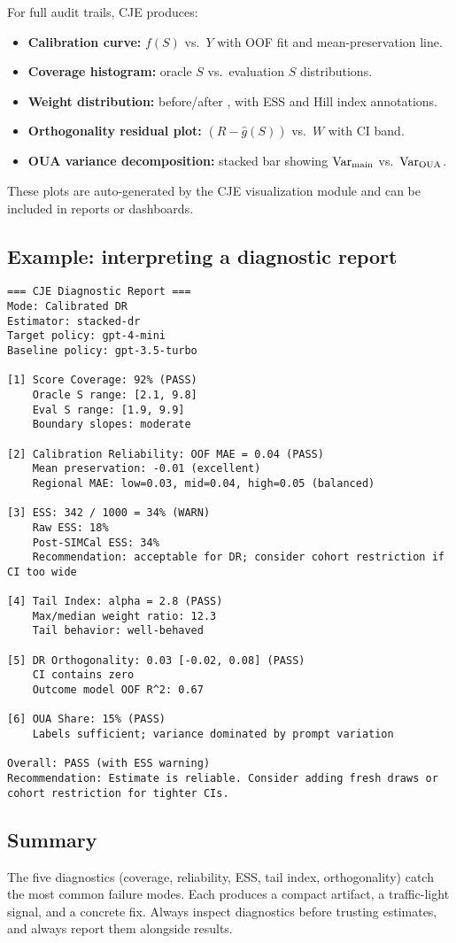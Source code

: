 For full audit trails, CJE produces:
\begin{itemize}
\item \textbf{Calibration curve:} $f(S)$ vs.\ $Y$ with OOF fit and mean-preservation line.
\item \textbf{Coverage histogram:} oracle $S$ vs.\ evaluation $S$ distributions.
\item \textbf{Weight distribution:} before/after \simcal, with ESS and Hill index annotations.
\item \textbf{Orthogonality residual plot:} $(R - \hat{g}(S))$ vs.\ $W$ with CI band.
\item \textbf{OUA variance decomposition:} stacked bar showing $\operatorname{Var}_{\text{main}}$ vs.\ $\operatorname{Var}_{\text{OUA}}$.
\end{itemize}

These plots are auto-generated by the CJE visualization module and can be included in reports or dashboards.

\subsection{Example: interpreting a diagnostic report}

\begin{lstlisting}
=== CJE Diagnostic Report ===
Mode: Calibrated DR
Estimator: stacked-dr
Target policy: gpt-4-mini
Baseline policy: gpt-3.5-turbo

[1] Score Coverage: 92% (PASS)
    Oracle S range: [2.1, 9.8]
    Eval S range: [1.9, 9.9]
    Boundary slopes: moderate

[2] Calibration Reliability: OOF MAE = 0.04 (PASS)
    Mean preservation: -0.01 (excellent)
    Regional MAE: low=0.03, mid=0.04, high=0.05 (balanced)

[3] ESS: 342 / 1000 = 34% (WARN)
    Raw ESS: 18%
    Post-SIMCal ESS: 34%
    Recommendation: acceptable for DR; consider cohort restriction if CI too wide

[4] Tail Index: alpha = 2.8 (PASS)
    Max/median weight ratio: 12.3
    Tail behavior: well-behaved

[5] DR Orthogonality: 0.03 [-0.02, 0.08] (PASS)
    CI contains zero
    Outcome model OOF R^2: 0.67

[6] OUA Share: 15% (PASS)
    Labels sufficient; variance dominated by prompt variation

Overall: PASS (with ESS warning)
Recommendation: Estimate is reliable. Consider adding fresh draws or cohort restriction for tighter CIs.
\end{lstlisting}

\subsection{Summary}

The five diagnostics (coverage, reliability, ESS, tail index, orthogonality) catch the most common failure modes. Each produces a compact artifact, a traffic-light signal, and a concrete fix. Always inspect diagnostics before trusting estimates, and always report them alongside results.
